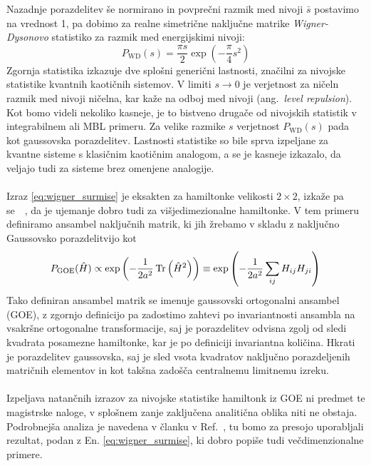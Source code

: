  Nazadnje porazdelitev še normirano in povprečni razmik med nivoji $\bar{s}$ postavimo na vrednost 1, pa dobimo za realne simetrične naključne matrike \emph{Wigner-Dysonovo} statistiko za razmik med energijskimi nivoji: 
 \begin{equation}\label{eq:wigner-dyson}
 P_\mathrm{WD}(s)=\frac{\pi s}{2}\exp\left(-\frac{\pi}{4}s^2\right)
 \end{equation}
 Zgornja statistika izkazuje dve splošni generični lastnosti, značilni za nivojske statistike kvantnih kaotičnih sistemov. V limiti $s\to 0$ je verjetnost za ničeln razmik med nivoji ničelna, kar kaže na odboj med nivoji (ang.~\emph{level repulsion}). Kot bomo videli nekoliko kasneje, je to bistveno drugače od nivojskih statistik v integrabilnem ali MBL primeru. Za velike razmike $s$ verjetnost $P_\mathrm{WD}(s)$ pada kot gaussovska porazdelitev. Lastnosti statistike so bile sprva izpeljane za kvantne sisteme s klasičnim kaotičnim analogom, a se je kasneje izkazalo, da veljajo tudi za sisteme brez omenjene analogije.\\\\
 Izraz \eqref{eq:wigner_surmise} je eksakten za hamiltonke velikosti $2\times2$, izkaže pa se~\cite{abanin2018ergodicity}~\cite{Atas_Distribution_PhysRevLett.110.084101}, da je ujemanje dobro tudi za višjedimezionalne hamiltonke. V tem primeru definiramo ansambel naključnih matrik, ki jih žrebamo v skladu z naključno Gaussovsko porazdelitvijo kot
 \begin{equation}
 P_\mathrm{GOE}(\hat{H})\propto \exp\left(-\frac{1}{2a^2}\mathop{\rm Tr}\left(\hat{H}^2\right) \right) \equiv \exp\left(-\frac{1}{2a^2}\sum\limits_{ij}H_{ij}H_{ji} \right)
 \end{equation}
 Tako definiran ansambel matrik se imenuje gaussovski ortogonalni ansambel (GOE), z zgornjo definicijo pa zadostimo zahtevi po invariantnosti ansambla na vsakršne ortogonalne transformacije, saj je porazdelitev odvisna zgolj od sledi kvadrata posamezne hamiltonke, kar je po definiciji invariantna količina. Hkrati je porazdelitev gaussovska, saj je sled vsota kvadratov naključno porazdeljenih matričnih elementov in kot takšna zadošča centralnemu limitnemu izreku. \\\\Izpeljava natančnih izrazov za nivojske statistike hamiltonk iz GOE ni predmet te magistrske naloge, v splošnem zanje zaključena analitična oblika niti ne obstaja. Podrobnejša analiza je navedena v članku v Ref.~\cite{Atas_Distribution_PhysRevLett.110.084101}, tu bomo za presojo uporabljali rezultat, podan z En. \eqref{eq:wigner_surmise}, ki dobro popiše tudi večdimenzionalne primere. 
